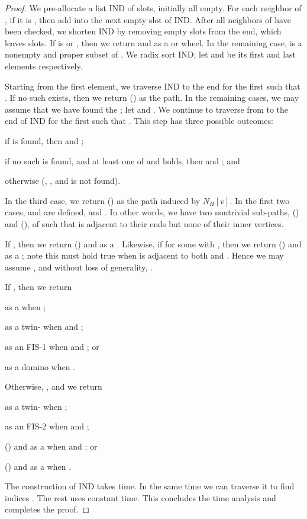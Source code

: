 \documentclass[10pt]{article}
\newcommand{\hv}[1]{\ensuremath{N_H[#1]}}
\begin{document}
\begin{proof}
  We pre-allocate a list {\sf IND} of  slots, initially all
  empty.  For each neighbor of , if it is , then add  into
  the next empty slot of {\sf IND}.  After all neighbors of  have
  been checked, we shorten {\sf IND} by removing empty slots from the
  end, which leaves  slots.  If  is  or ,
  then we return  and  as a  or wheel.  In the remaining
  case,  is a nonempty and proper subset of .  We radix
  sort {\sf IND}; let  and  be its first and last elements
  respectively.

  Starting from the first element, we traverse {\sf IND} to the end
  for the first  such that .  If
  no such  exists, then we return () as the path.
  In the remaining cases, we may assume that we have found the ;
  let  and .  We continue
  to traverse from  to the end of {\sf IND} for the first 
  such that .  This step has three
  possible outcomes:
  \begin{inparaenum}[(1)]
  \item if  is found, then  and ;
  \item if no such  is found, and at least one of  and
     holds, then  and ; and
  \item otherwise (, , and  is not found).
  \end{inparaenum}
  In the third case, we return () as the path induced by \hv{v}.  In the first two cases,
   and  are defined, and .  In other words, we
  have two nontrivial sub-paths, ()
  and (), of  such that  is
  adjacent to their ends but none of their inner vertices.

  If , then we return () and  as a .  Likewise, if 
  for some  with , then we return
  () and  as a ;
  note this must hold true when  is adjacent to both 
  and .  Hence we may assume , and
  without loss of generality, .  

  If , then we return
  \begin{inparaenum}[(\itshape 1\upshape)]
  \item  as a  when ;
  \item  as a twin- when  and ;
  \item  as an FIS-1 when  and ; or
  \item  as a domino
    when .
  \end{inparaenum}
  Otherwise, , and we return
  \begin{inparaenum}[(\itshape 1\upshape)]
  \item  as a twin- when ;
  \item  as an FIS-2 when  and ;
  \item () and  as a 
    when  and ; or
  \item () and  as a  when
    .
  \end{inparaenum}

  The construction of {\sf IND} takes  time.  In the same
  time we can traverse it to find indices .  The rest
  uses constant time.  This concludes the time analysis and completes
  the proof.
\end{proof}
\end{document}
